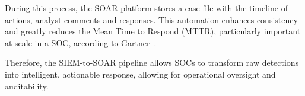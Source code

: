 During this process, the SOAR platform stores a case file with the timeline of actions, analyst comments and responses. This automation enhances consistency and greatly reduces the Mean Time to Respond (MTTR), particularly important at scale in a SOC, according to Gartner~\cite{gartner-siem-soar}.

Therefore, the SIEM-to-SOAR pipeline allows SOCs to transform raw detections into intelligent, actionable response, allowing for operational oversight and auditability.
